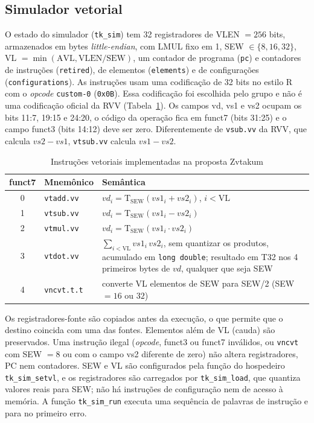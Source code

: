 \documentclass[journal]{IEEEtran}
\begin{document}
\subsection{Simulador vetorial}
O estado do simulador (\texttt{tk\_sim}) tem 32 registradores de VLEN $=256$ bits, armazenados
em bytes \emph{little-endian}, com LMUL fixo em 1, SEW $\in\{8,16,32\}$,
VL $=\min(\mathrm{AVL}, \mathrm{VLEN}/\mathrm{SEW})$, um contador de
programa (\texttt{pc}) e contadores de instruções (\texttt{retired}), de elementos (\texttt{elements}) e de configurações (\texttt{configurations}). As instruções usam uma
codificação de 32 bits no estilo R com o \emph{opcode} \texttt{custom-0}
(\texttt{0x0B}). Essa codificação foi escolhida pelo grupo e não é uma
codificação oficial da RVV (Tabela~\ref{tab:isa}). Os campos vd, vs1 e vs2
ocupam os bits 11:7, 19:15 e 24:20, o código da operação fica em funct7
(bits 31:25) e o campo funct3 (bits 14:12) deve ser zero. Diferentemente
de \texttt{vsub.vv} da RVV, que calcula $vs2-vs1$, \texttt{vtsub.vv}
calcula $vs1-vs2$.

\begin{table}[!t]
\renewcommand{\arraystretch}{1.15}
\caption{Instruções vetoriais implementadas na proposta Zvtakum}
\label{tab:isa}
\centering
\begin{tabular}{c l p{3.8cm}}
\hline
funct7 & Mnemônico & Semântica \\
\hline
0 & \texttt{vtadd.vv} & $vd_i = \mathrm{T}_{\mathrm{SEW}}(vs1_i + vs2_i)$, $i<\mathrm{VL}$\\
1 & \texttt{vtsub.vv} & $vd_i = \mathrm{T}_{\mathrm{SEW}}(vs1_i - vs2_i)$\\
2 & \texttt{vtmul.vv} & $vd_i = \mathrm{T}_{\mathrm{SEW}}(vs1_i \cdot vs2_i)$\\
3 & \texttt{vtdot.vv} & $\sum_{i<\mathrm{VL}} vs1_i\, vs2_i$, sem quantizar os produtos, acumulado em \texttt{long double}; resultado em T32 nos 4 primeiros bytes de $vd$, qualquer que seja SEW\\
4 & \texttt{vncvt.t.t} & converte VL elementos de SEW para SEW/2 (SEW $=16$ ou $32$)\\
\hline
\end{tabular}
\end{table}

Os registradores-fonte são copiados antes da execução, o que permite que o
destino coincida com uma das fontes. Elementos além de VL (cauda) são
preservados. Uma instrução ilegal (\emph{opcode}, funct3 ou funct7
inválidos, ou \texttt{vncvt} com SEW $=8$ ou com o campo vs2 diferente de
zero) não altera registradores, PC nem contadores. SEW e VL são
configurados pela função do hospedeiro \texttt{tk\_sim\_setvl}, e os
registradores são carregados por \texttt{tk\_sim\_load}, que quantiza
valores reais para SEW; não há instruções de configuração nem de acesso à
memória. A função \texttt{tk\_sim\_run} executa uma sequência de palavras
de instrução e para no primeiro erro.
\end{document}
